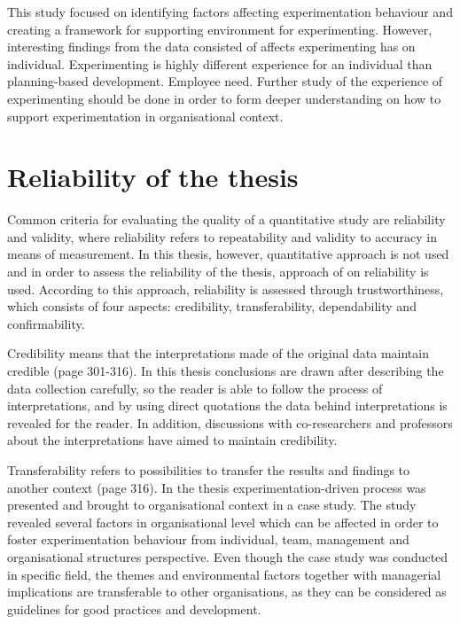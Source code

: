 This study focused on identifying factors affecting experimentation behaviour and creating a framework for supporting environment for experimenting. However, interesting findings from the data consisted of affects experimenting has on individual. Experimenting is highly different experience for an individual than planning-based development. Employee need. Further study of the experience of experimenting should be done in order to form deeper understanding on how to support experimentation in organisational context. 

\section{Reliability of the thesis}
Common criteria for evaluating the quality of a quantitative study are reliability and validity, where reliability refers to repeatability and validity to accuracy in means of measurement. In this thesis, however, quantitative approach is not used and in order to assess the reliability of the thesis, approach of \citet{lincoln1985naturalistic} on reliability is used. According to this approach, reliability is assessed through trustworthiness, which consists of four aspects: credibility, transferability, dependability and confirmability. 

Credibility means that the interpretations made of the original data maintain credible \citep{lincoln1985naturalistic} (page 301-316). In this thesis conclusions are drawn after describing the data collection carefully, so the reader is able to follow the process of interpretations, and by using direct quotations the data behind interpretations is revealed for the reader. In addition, discussions with co-researchers and professors about the interpretations have aimed to maintain credibility. 

Transferability refers to possibilities to transfer the results and findings to another context \citep{lincoln1985naturalistic} (page 316). In the thesis experimentation-driven process was presented and brought to organisational context in a case study. The study revealed several factors in organisational level which can be affected in order to foster experimentation behaviour from individual, team, management and organisational structures perspective. Even though the case study was conducted in specific field, the themes and environmental factors together with managerial implications are transferable to other organisations, as they can be considered as guidelines for good practices and development. 

